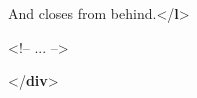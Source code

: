 \documentclass[11pt,twoside]{article}\makeatletter
\begin{document}
\begin{shaded}
\hspace*{6pt}\hspace*{6pt}And closes from behind.{</\textbf{l}>}\mbox{}\newline 
\hspace*{6pt}\mbox{}\newline 
{}\mbox{}\newline 
\begin{it}<!-- ... -->\end{it}\mbox{}\newline 
{</\textbf{div}>}\end{shaded}\egroup\par \noindent  \par
\end{document}
